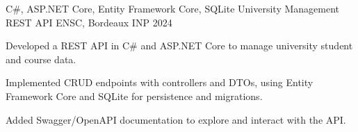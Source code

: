 
\begin{cventries}
  \cventry
    {C\#, ASP.NET Core, Entity Framework Core, SQLite}
    {University Management REST API}
    {ENSC, Bordeaux INP}
    {2024}
    {
      \begin{cvitems}
        \item {Developed a REST API in C\# and ASP.NET Core to manage university student and course data.}
        \item {Implemented CRUD endpoints with controllers and DTOs, using Entity Framework Core and SQLite for persistence and migrations.}
        \item {Added Swagger/OpenAPI documentation to explore and interact with the API.}
      \end{cvitems}
    }
\end{cventries}
